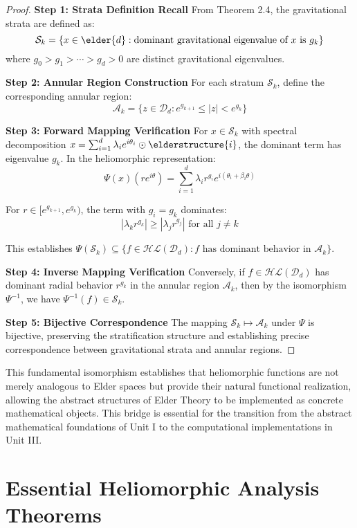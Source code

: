 \begin{proof}
\textbf{Step 1: Strata Definition Recall}
From Theorem 2.4, the gravitational strata are defined as:
$$\mathcal{S}_k = \{x \in \elder{d} : \text{dominant gravitational eigenvalue of } x \text{ is } g_k\}$$
where $g_0 > g_1 > \cdots > g_d > 0$ are distinct gravitational eigenvalues.

\textbf{Step 2: Annular Region Construction}
For each stratum $\mathcal{S}_k$, define the corresponding annular region:
$$\mathcal{A}_k = \{z \in \mathcal{D}_d : e^{g_{k+1}} \leq |z| < e^{g_k}\}$$

\textbf{Step 3: Forward Mapping Verification}
For $x \in \mathcal{S}_k$ with spectral decomposition $x = \sum_{i=1}^d \lambda_i e^{i\theta_i} \odot \elderstructure{i}$, the dominant term has eigenvalue $g_k$. In the heliomorphic representation:
$$\Psi(x)(re^{i\theta}) = \sum_{i=1}^d \lambda_i r^{g_i} e^{i(\theta_i + \beta_i \theta)}$$

For $r \in [e^{g_{k+1}}, e^{g_k})$, the term with $g_i = g_k$ dominates:
$$|\lambda_k r^{g_k}| \geq |\lambda_j r^{g_j}| \text{ for all } j \neq k$$

This establishes $\Psi(\mathcal{S}_k) \subseteq \{f \in \mathcal{HL}(\mathcal{D}_d) : f \text{ has dominant behavior in } \mathcal{A}_k\}$.

\textbf{Step 4: Inverse Mapping Verification}
Conversely, if $f \in \mathcal{HL}(\mathcal{D}_d)$ has dominant radial behavior $r^{g_k}$ in the annular region $\mathcal{A}_k$, then by the isomorphism $\Psi^{-1}$, we have $\Psi^{-1}(f) \in \mathcal{S}_k$.

\textbf{Step 5: Bijective Correspondence}
The mapping $\mathcal{S}_k \mapsto \mathcal{A}_k$ under $\Psi$ is bijective, preserving the stratification structure and establishing precise correspondence between gravitational strata and annular regions.
\end{proof}

This fundamental isomorphism establishes that heliomorphic functions are not merely analogous to Elder spaces but provide their natural functional realization, allowing the abstract structures of Elder Theory to be implemented as concrete mathematical objects. This bridge is essential for the transition from the abstract mathematical foundations of Unit I to the computational implementations in Unit III.

\section{Essential Heliomorphic Analysis Theorems}

